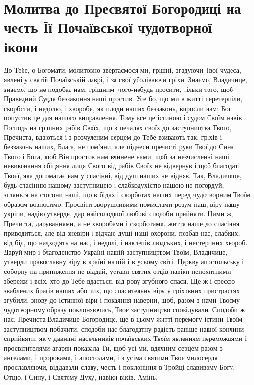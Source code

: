 \documentclass[chapters.tex]{subfiles}
\begin{document}
\section{Молитва до Пресвятої Богородиці на честь Її Почаївської чудотворної ікони}
До Тебе, о Богомати, молитовно звертаємося ми, грішні, згадуючи Твої чудеса, явлені у святій Почаївській лаврі, і за свої уболіваючи гріхи. Знаємо, Владичице, знаємо, що не подобає нам, грішним, чого-небудь просити, тільки того, щоб Праведний Суддя беззаконня наші простив. Усе бо, що ми в житті перетерпіли, скорботи, і недолю, і хвороби, як плоди наших беззаконь, виросли нам; Бог попустив це для нашого виправлення. Тому все це істиною і судом Своїм навів Господь на грішних рабів Своїх, що в печалях своїх до заступництва Твого, Пречиста, вдаються і з розчуленим серцем до Тебе взивають так: гріхів і беззаконь наших, Блага, не пом’яни, але піднеси пречисті руки Твої до Сина Твого і Бога, щоб Він простив нам вчинене нами, щоб за незчисленні наші невиконання обіцяння лиця Свого від рабів Своїх не відвернув і щоб благодаті Твоєї, яка допомагає нам у спасінні, від душ наших не відняв. Так, Владичице, будь спасінню нашому заступницею і слабкодухістю нашою не погордуй, зглянься на стогони наші, що в бідах і скорботах наших перед чудотворним Твоїм образом возносимо. Просвіти зворушливими помислами розум наш, віру нашу укріпи, надію утверди, дар найсолодшої любові сподоби прийняти. Цими ж, Пречиста, даруваннями, а не хворобами і скорботами, життя наше до спасіння приводиться, але від зневіри і відчаю душі наші охорони, позбав нас, слабких, від бід, що надходять на нас, і недолі, і наклепів людських, і нестерпних хвороб. Даруй мир і благоденство Україні нашій заступництвом Твоїм, Владичице, утверди православну віру в країні нашій і в усьому світі. Церкву апостольську і соборну на приниження не віддай, устави святих отців навіки непохитними збережи і всіх, хто до Тебе вдається, від рову згубного спаси. Ще ж і єрессю зваблених братів наших або тих, що спасительну віру у гріховних пристрастях згубили, знову до істинної віри і покаяння наверни, щоб, разом з нами Твоєму чудотворному образу поклоняючись, Твоє заступництво сповідували. Сподоби ж нас, Пречиста Владичице Богородице, ще в цьому житті перемогу істини Твоїм заступництвом побачити, сподоби нас благодатну радість раніше нашої кончини сприйняти, як у давнині насельників почаївських Твоїм явленням переможцями і просвітителями агарян показала Ти, щоб усі ми, вдячним серцем разом з ангелами, і пророками, і апостолами, і з усіма святими Твоє милосердя прославляючи, віддавали славу, честь і поклоніння в Тройці славивому Богу, Отцю, і Сину, і Святому Духу, навіки-віків. Амінь.
\end{document}

